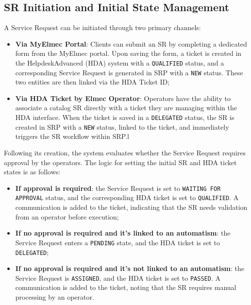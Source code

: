 \subsection{SR Initiation and Initial State Management}
A Service Request can be initiated through two primary channels:

\begin{itemize}
    \item \textbf{Via MyElmec Portal}: Clients can submit an SR by completing a dedicated form from the MyElmec portal. Upon saving the form, a ticket is created in the HelpdeskAdvanced (HDA) system with a \texttt{QUALIFIED} status, and a corresponding Service Request is generated in SRP with a \texttt{NEW} status. These two entities are then linked via the HDA Ticket ID;
    \item \textbf{Via HDA Ticket by Elmec Operator}: Operators have the ability to associate a catalog SR directly with a ticket they are managing within the HDA interface. When the ticket is saved in a \texttt{DELEGATED} status, the SR is created in SRP with a \texttt{NEW} status, linked to the ticket, and immediately triggers the SR workflow within SRP.l
\end{itemize}

Following its creation, the system evaluates whether the Service Request requires approval by the operators. The logic for setting the initial SR and HDA ticket states is as follows:
\begin{itemize}
    \item \textbf{If approval is required}: the Service Request is set to \texttt{WAITING FOR APPROVAL} status, and the corresponding HDA ticket is set to \texttt{QUALIFIED}. A communication is added to the ticket, indicating that the SR needs validation from an operator before execution;
    \item \textbf{If no approval is required and it's linked to an automatism}: the Service Request enters a \texttt{PENDING} state, and the HDA ticket is set to \texttt{DELEGATED};
    \item \textbf{If no approval is required and it's not linked to an automatism}: the Service Request is \texttt{ASSIGNED}, and the HDA ticket is set to \texttt{PASSED}. A communication is added to the ticket, noting that the SR requires manual processing by an operator.
\end{itemize}

